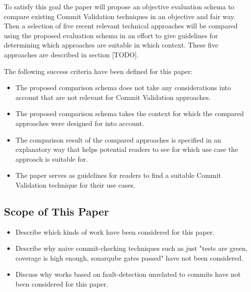 To satisfy this goal the paper will propose an objective evaluation schema to compare existing Commit Validation techniques in an objective and fair way. Then a selection of five recent relevant technical approaches will be compared using the proposed evaluation schema in an effort to give guidelines for determining which approaches are suitable in which context. These five approaches are described in section [TODO].

The following success criteria have been defined for this paper: 

\begin{itemize}
	\item The proposed comparison schema does not take any considerations into account that are not relevant for Commit Validation approaches.
	\item The proposed comparison schema takes the context for which the compared approaches were designed for into account.
	\item The comparison result of the compared approaches is specified in an explanatory way that helps potential readers to see for which use case the approach is suitable for.
	\item The paper serves as guidelines for readers to find a suitable Commit Validation technique for their use cases.
\end{itemize}



\subsection{Scope of This Paper}
\label{sec:scope}
\begin{itemize}
	\item Describe which kinds of work have been considered for this paper.
	\item Describe why naive commit-checking techniques such as just "tests are green, coverage is high enough, sonarqube gates passed" have not been considered.
	\item Discuss why works based on fault-detection unrelated to commits have not been considered for this paper.
\end{itemize}

